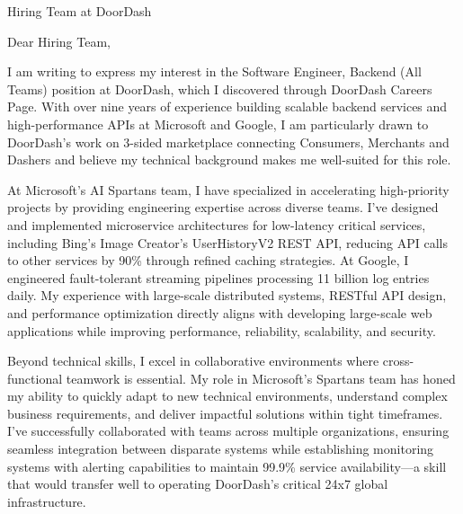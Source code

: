 
\newcommand{\COMPANY}{DoorDash}
\newcommand{\POSITION}{Software Engineer, Backend (All Teams)}
\newcommand{\SOURCE}{DoorDash Careers Page}
\newcommand{\PRODUCT}{3-sided marketplace connecting Consumers, Merchants and Dashers}
\newcommand{\SPECIFICREASON}{your focus on building the world's most reliable on-demand logistics engine and transition from a monolithic architecture to a microservice-based one}
\newcommand{\RELEVANTTECHNOLOGY}{microservice architectures and distributed systems}
\newcommand{\TEAMNAME}{Backend Engineering team}

\noindent Hiring Team at \COMPANY
\vspace{0.4cm}

\noindent Dear Hiring Team,
\vspace{0.4cm}

I am writing to express my interest in the \POSITION{} position at \COMPANY, which I discovered through \SOURCE. With over nine years of experience building scalable backend services and high-performance APIs at Microsoft and Google, I am particularly drawn to \COMPANY's work on \PRODUCT{} and believe my technical background makes me well-suited for this role.

At Microsoft's AI Spartans team, I have specialized in accelerating high-priority projects by providing engineering expertise across diverse teams. I've designed and implemented microservice architectures for low-latency critical services, including Bing's Image Creator's UserHistoryV2 REST API, reducing API calls to other services by 90\% through refined caching strategies. At Google, I engineered fault-tolerant streaming pipelines processing 11 billion log entries daily. My experience with large-scale distributed systems, RESTful API design, and performance optimization directly aligns with developing large-scale web applications while improving performance, reliability, scalability, and security.

Beyond technical skills, I excel in collaborative environments where cross-functional teamwork is essential. My role in Microsoft's Spartans team has honed my ability to quickly adapt to new technical environments, understand complex business requirements, and deliver impactful solutions within tight timeframes. I've successfully collaborated with teams across multiple organizations, ensuring seamless integration between disparate systems while establishing monitoring systems with alerting capabilities to maintain 99.9\% service availability—a skill that would transfer well to operating DoorDash's critical 24x7 global infrastructure.


